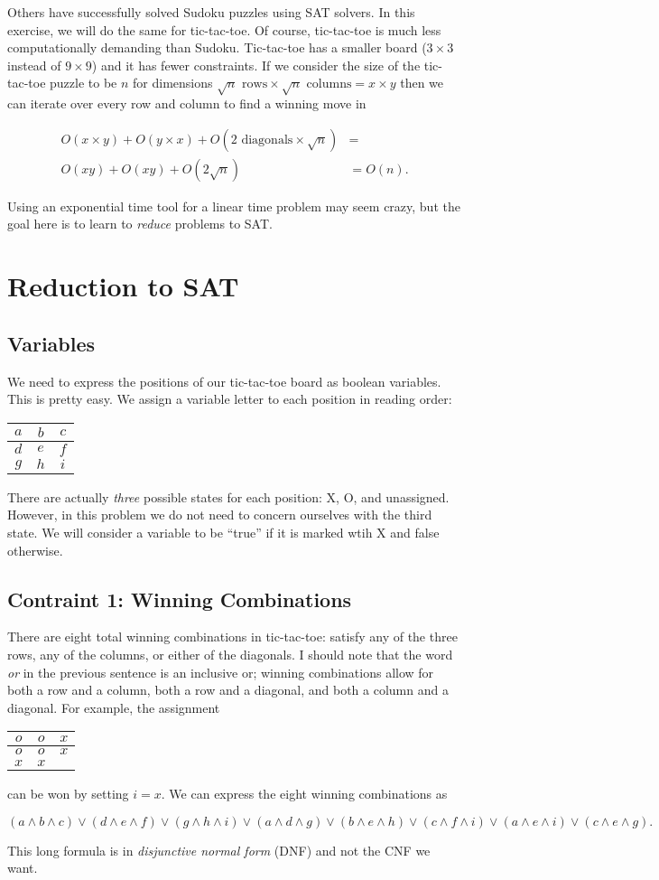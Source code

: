 \documentclass[12pt]{article}
\newcommand{\tictactoe}[9]{\begin{center}\begin{tabular}{ c | c | c }{$#1$} & {$#2$} & {$#3$} \\ \hline {$#4$} & {$#5$} & {$#6$} \\ \hline {$#7$} & {$#8$} & {$#9$} \end{tabular}\end{center}}
\begin{document}
Others have successfully solved Sudoku puzzles using SAT solvers.
In this exercise, we will do the same for tic-tac-toe.
Of course, tic-tac-toe is much less computationally demanding than Sudoku.
Tic-tac-toe has a smaller board ($3 \times 3$ instead of $9 \times 9$) and it has fewer constraints.
If we consider the size of the tic-tac-toe puzzle to be $n$ for dimensions $\sqrt{n} \textrm{ rows} \times \sqrt{n} \textrm{ columns} = x \times y$ then we can iterate over every row and column to find a winning move in

\begin{align}O(x \times y) + O(y \times x ) + O(2 \textrm{ diagonals} \times \sqrt{n}) &= \\
O(xy)+O(xy)+O(2\sqrt{n})
&=O(n).
\end{align}

Using an exponential time tool for a linear time problem may seem crazy, but the goal here is to learn to \textit{reduce} problems to SAT.

\section{Reduction to SAT}

\subsection{Variables}

We need to express the positions of our tic-tac-toe board as boolean variables. This is pretty easy. We assign a variable letter to each position in reading order:

\tictactoe{a}{b}{c}{d}{e}{f}{g}{h}{i}

There are actually \textit{three} possible states for each position: X, O, and unassigned. However, in this problem we do not need to concern ourselves with the third state.
We will consider a variable to be ``true'' if it is marked wtih X and false otherwise.

\subsection{Contraint 1: Winning Combinations}

There are eight total winning combinations in tic-tac-toe: satisfy any of the three rows, any of the columns, or either of the diagonals.
I should note that the word \textit{or} in the previous sentence is an inclusive or; winning combinations allow for both a row and a column, both a row and a diagonal, and both a column and a diagonal. For example, the assignment

\tictactoe{o}{o}{x}{o}{o}{x}{x}{x}{}

can be won by setting $i=x$.  We can express the eight winning combinations as

\begin{equation}(a \wedge b \wedge c) \vee (d \wedge e \wedge f) \vee (g \wedge h \wedge i)
\vee
(a \wedge d \wedge g) \vee (b \wedge e \wedge h) \vee (c \wedge f \wedge i)
\vee
(a \wedge e \wedge i) \vee (c \wedge e \wedge g).\end{equation}

This long formula is in \textit{disjunctive normal form} (DNF) and not the CNF we want.
\end{document}
